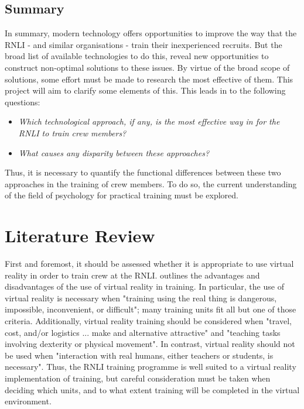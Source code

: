 \documentclass[ %
                    author={Elis Jones},
                supervisor={Dr. Kirsten Cater},
                    degree={BSc},
                     title={The Effect of Presentation Medium on Spatial Cognition},
                  subtitle={in the Virtual Environment},
                      year={2018} ]{dissertation}
\begin{document}
\subsection{Summary}
In summary, modern technology offers opportunities to improve the way that the RNLI - and similar organisations - train their inexperienced recruits. But the broad list of available technologies to do this, reveal new opportunities to construct non-optimal solutions to these issues. By virtue of the broad scope of solutions, some effort must be made to research the most effective of them. This project will aim to clarify some elements of this. This leads in to the following questions:

\begin{itemize}
    \item \textit{Which technological approach, if any, is the most effective way in for the RNLI to train crew members?}
    \item \textit{What causes any disparity between these approaches?}
\end{itemize}

Thus, it is necessary to quantify the functional differences between these two approaches in the training of crew members. To do so, the current understanding of the field of psychology for practical training must be explored.

\section{Literature Review}\label{litreview}
First and foremost, it should be assessed whether it is appropriate to use virtual reality in order to train crew at the RNLI. \cite{Pantelidis2010} outlines the advantages and disadvantages of the use of virtual reality in training. In particular, the use of virtual reality is necessary when "training using the real thing is dangerous, impossible, inconvenient, or difficult"; many training units fit all but one of those criteria. Additionally, virtual reality training should be considered when "travel, cost, and/or logistics ... make and alternative attractive" and "teaching tasks involving dexterity or physical movement". In contrast, virtual reality should not be used when "interaction with real humans, either teachers or students, is necessary". Thus, the RNLI training programme is well suited to a virtual reality implementation of training, but careful consideration must be taken when deciding which units, and to what extent training will be completed in the virtual environment. 
\end{document}
